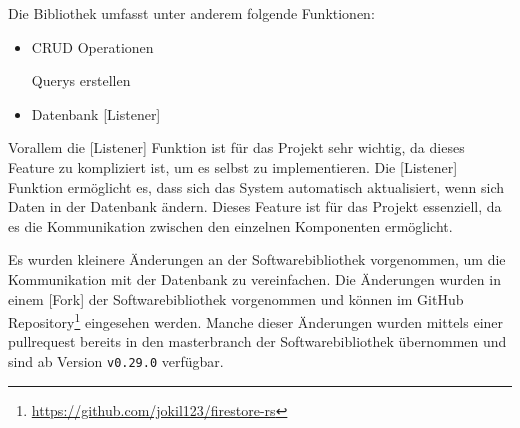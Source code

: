 Die Bibliothek umfasst unter anderem folgende Funktionen:
\begin{itemize}
    \item \ac{CRUD} Operationen
    \item [Querys] erstellen
    \item Datenbank [Listener]
\end{itemize}

Vorallem die [Listener] Funktion ist für das Projekt sehr wichtig, da dieses Feature zu kompliziert ist, um es selbst zu implementieren. Die [Listener] Funktion ermöglicht es, dass sich das System automatisch aktualisiert, wenn sich Daten in der Datenbank ändern. Dieses Feature ist für das Projekt essenziell, da es die Kommunikation zwischen den einzelnen Komponenten ermöglicht.

Es wurden kleinere Änderungen an der Softwarebibliothek vorgenommen, um die Kommunikation mit der Datenbank zu vereinfachen. Die Änderungen wurden in einem [Fork] der Softwarebibliothek vorgenommen und können im GitHub Repository\footnote{\url{https://github.com/jokil123/firestore-rs}} eingesehen werden. Manche dieser Änderungen wurden mittels einer \Gls{pullrequest} bereits in den \Gls{masterbranch} der Softwarebibliothek übernommen und sind ab Version \texttt{v0.29.0} verfügbar.